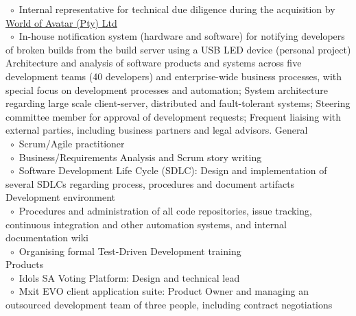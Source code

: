 \documentclass[10pt,a4paper,final]{columncv}
\newcommand{\cvitembullet}{~$\circ$~}
\newcommand{\cvitempbullet}{\phantom{\cvitembullet}}
\begin{document}
\begin{cvenv}
{         \cvitembullet Internal representative for technical due diligence during the 
         \cvitempbullet acquisition by \href{http://www.worldofavatar.com/}{World of Avatar (Pty) Ltd} \\
         \cvitembullet In-house notification system (hardware and software) for notifying 
         \cvitempbullet developers of broken builds from the build server using a USB
         \cvitempbullet LED device (personal project)
         \\}
         {Architecture and analysis of software products and systems across five 
          development teams (40 developers) and enterprise-wide business processes, with 
          special focus on development processes and automation; System architecture 
          regarding large scale client-server, distributed and fault-tolerant systems; 
          Steering committee member for approval of development requests; Frequent 
          liaising with external parties, including business partners and legal advisors.}
         {General \\
          \cvitembullet Scrum/Agile practitioner \\
          \cvitembullet Business/Requirements Analysis and Scrum story writing \\
          \cvitembullet Software Development Life Cycle (SDLC): Design and 
          \cvitempbullet implementation of several SDLCs regarding process, procedures 
          \cvitempbullet and document artifacts \\
          Development environment \\
          \cvitembullet Procedures and administration of all code repositories, issue 
          \cvitempbullet tracking, continuous integration and other automation systems, 
          \cvitempbullet and internal documentation wiki \\
          \cvitembullet Organising formal Test-Driven Development training \\
          Products \\
	  \cvitembullet Idols SA Voting Platform: Design and technical lead \\
          \cvitembullet Mxit EVO client application suite: Product Owner and managing 
          \cvitempbullet an outsourced development team of three people, including 
          \cvitempbullet contract negotiations \\
}
\end{cvenv}
\end{document}
